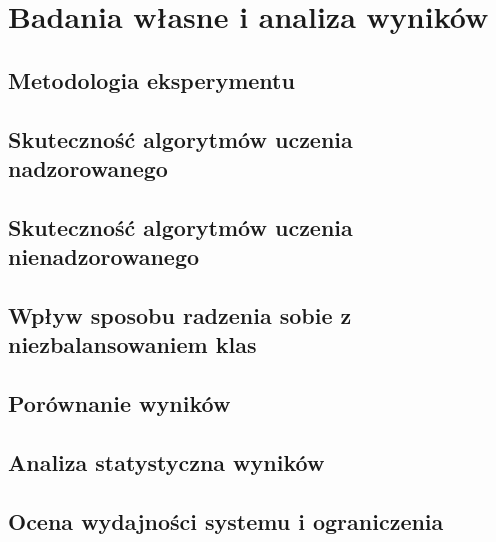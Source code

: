 \chapter{Badania własne i analiza wyników}
\label{ch:badania}

%       
%       
\section{Metodologia eksperymentu}
\section{Skuteczność algorytmów uczenia nadzorowanego}
\section{Skuteczność algorytmów uczenia nienadzorowanego}
\section{Wpływ sposobu radzenia sobie z niezbalansowaniem klas}
\section{Porównanie wyników}
\section{Analiza statystyczna wyników}
\section{Ocena wydajności systemu i ograniczenia}
